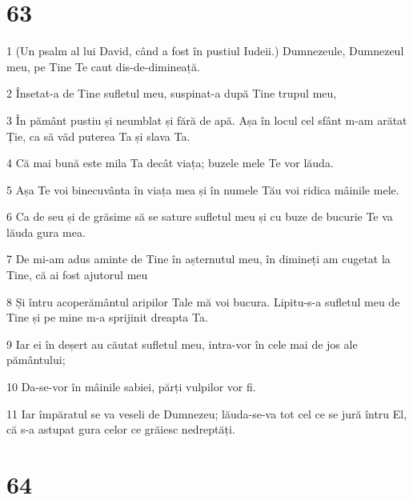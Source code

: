 \chapter{63}

\par 1 (Un psalm al lui David, când a fost în pustiul Iudeii.) Dumnezeule, Dumnezeul meu, pe Tine Te caut dis-de-dimineață.
\par 2 Însetat-a de Tine sufletul meu, suspinat-a după Tine trupul meu,
\par 3 În pământ pustiu și neumblat și fără de apă. Așa în locul cel sfânt m-am arătat Ție, ca să văd puterea Ta și slava Ta.
\par 4 Că mai bună este mila Ta decât viața; buzele mele Te vor lăuda.
\par 5 Așa Te voi binecuvânta în viața mea și în numele Tău voi ridica mâinile mele.
\par 6 Ca de seu și de grăsime să se sature sufletul meu și cu buze de bucurie Te va lăuda gura mea.
\par 7 De mi-am adus aminte de Tine în așternutul meu, în dimineți am cugetat la Tine, că ai fost ajutorul meu
\par 8 Și întru acoperământul aripilor Tale mă voi bucura. Lipitu-s-a sufletul meu de Tine și pe mine m-a sprijinit dreapta Ta.
\par 9 Iar ei în deșert au căutat sufletul meu, intra-vor în cele mai de jos ale pământului;
\par 10 Da-se-vor în mâinile sabiei, părți vulpilor vor fi.
\par 11 Iar împăratul se va veseli de Dumnezeu; lăuda-se-va tot cel ce se jură întru El, că s-a astupat gura celor ce grăiesc nedreptăți.

\chapter{64}

